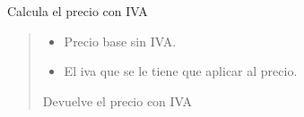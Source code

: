 \documentclass[letterpaper,10pt,spanish]{sphinxmanual}
\begin{document}
\begin{fulllineitems}
\label{\detokenize{index:calculadora.calcular_iva}}
\pysigstartsignatures
\pysiglinewithargsret
{}
{\sphinxparamcomma {}}
{}
\pysigstopsignatures
\sphinxAtStartPar
Calcula el precio con IVA
\begin{quote}\begin{description}
\begin{itemize}
\item {} 
\sphinxAtStartPar
{} \textendash{} Precio base sin IVA.

\item {} 
\sphinxAtStartPar
{} \textendash{} El iva que se le tiene que aplicar al precio.

\end{itemize}

\sphinxAtStartPar
Devuelve el precio con IVA

\end{description}\end{quote}

\end{fulllineitems}



\renewcommand{\indexname}{Índice de Módulos Python}
\begin{sphinxtheindex}
\let\bigletter\sphinxstyleindexlettergroup
\bigletter{c}
\item\relax{}
\end{sphinxtheindex}

\renewcommand{\indexname}{Índice}
\printindex
\end{document}
